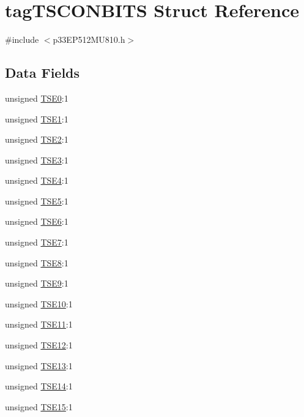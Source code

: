 \hypertarget{structtag_t_s_c_o_n_b_i_t_s}{}\section{tag\+T\+S\+C\+O\+N\+B\+I\+TS Struct Reference}
\label{structtag_t_s_c_o_n_b_i_t_s}


{\ttfamily \#include $<$p33\+E\+P512\+M\+U810.\+h$>$}

\subsection*{Data Fields}
\begin{DoxyCompactItemize}
\item 
unsigned \hyperlink{structtag_t_s_c_o_n_b_i_t_s_a89a62ebbac932e67f736c0d9c124c273}{T\+S\+E0}\+:1
\item 
unsigned \hyperlink{structtag_t_s_c_o_n_b_i_t_s_a71addc60d3454e5c6e9372aac09c63c3}{T\+S\+E1}\+:1
\item 
unsigned \hyperlink{structtag_t_s_c_o_n_b_i_t_s_a2ff4db349ba32457dd52b9c3df49057b}{T\+S\+E2}\+:1
\item 
unsigned \hyperlink{structtag_t_s_c_o_n_b_i_t_s_a18b8569c86c4bf1660ba3cfe63cd3d8c}{T\+S\+E3}\+:1
\item 
unsigned \hyperlink{structtag_t_s_c_o_n_b_i_t_s_a97383af0fd50f6aaa975d007bb530c95}{T\+S\+E4}\+:1
\item 
unsigned \hyperlink{structtag_t_s_c_o_n_b_i_t_s_ab196bd3cc88034fdad55c00d83e1c9d9}{T\+S\+E5}\+:1
\item 
unsigned \hyperlink{structtag_t_s_c_o_n_b_i_t_s_a99afe9785d459da1a47307fac0fbc819}{T\+S\+E6}\+:1
\item 
unsigned \hyperlink{structtag_t_s_c_o_n_b_i_t_s_a2cea31ef8b009c28e79638fae019a810}{T\+S\+E7}\+:1
\item 
unsigned \hyperlink{structtag_t_s_c_o_n_b_i_t_s_ac8f4d3f7b0b11c209cf23725dd6111d7}{T\+S\+E8}\+:1
\item 
unsigned \hyperlink{structtag_t_s_c_o_n_b_i_t_s_a571bf0b8762c4c1805f16c0ddf743dc8}{T\+S\+E9}\+:1
\item 
unsigned \hyperlink{structtag_t_s_c_o_n_b_i_t_s_a1c105cf9341a7499191b04d0542998fc}{T\+S\+E10}\+:1
\item 
unsigned \hyperlink{structtag_t_s_c_o_n_b_i_t_s_af5b8dbc9c2296a25a7af2f760338c6d7}{T\+S\+E11}\+:1
\item 
unsigned \hyperlink{structtag_t_s_c_o_n_b_i_t_s_a3df8ea408928591bbc1ef8ad9154d916}{T\+S\+E12}\+:1
\item 
unsigned \hyperlink{structtag_t_s_c_o_n_b_i_t_s_a7609a3043957139a062eea22ae8d4826}{T\+S\+E13}\+:1
\item 
unsigned \hyperlink{structtag_t_s_c_o_n_b_i_t_s_ad6d808d9c954e920528688ef1181a14a}{T\+S\+E14}\+:1
\item 
unsigned \hyperlink{structtag_t_s_c_o_n_b_i_t_s_a94acb96d57a133df6d868f56581d64fb}{T\+S\+E15}\+:1
\end{DoxyCompactItemize}


